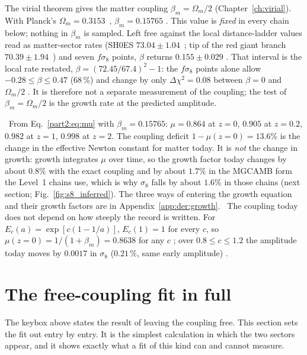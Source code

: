 \begin{keybox}[title={The coupling is predicted, not fitted}]
The virial theorem gives the matter coupling $\beta_m=\Omega_m/2$ (Chapter~\ref{ch:virial}). With Planck's $\Omega_m=0.3153$~\cite{Planck2018VI},
$\beta_m=0.15765$ \derived. This value is \emph{fixed} in every chain below; nothing in $\beta_m$ is sampled.
Left free against the local distance-ladder values read as matter-sector rates (SH0ES $73.04\pm1.04$~\cite{Riess2022}; tip of the red giant branch $70.39\pm1.94$~\cite{Freedman2025}) and seven $f\sigma_8$ points, $\beta$ returns $0.155\pm0.029$ \calc. That interval is the local rate restated, $\beta=(72.45/67.4)^2-1$: the $f\sigma_8$ points alone allow $-0.28\le\beta\le0.47$ (68\,\%) and change by only $\Delta\chi^2=0.08$ between $\beta=0$ and $\Omega_m/2$ \calc. It is therefore not a separate measurement of the coupling; the test of $\beta_m=\Omega_m/2$ is the growth rate at the predicted amplitude.
\end{keybox}

\begin{checkbox}
\calc\ From Eq.~\eqref{part2:eq:mu} with $\beta_m=0.15765$: $\mu=0.864$ at $z=0$, $0.905$ at $z=0.2$, $0.982$ at $z=1$, $0.998$ at $z=2$.
The coupling deficit $1-\mu(z{=}0)=13.6\%$ is the change in the effective Newton constant for matter today. It is \emph{not} the change in growth:
growth integrates $\mu$ over time, so the growth factor today changes by about $0.8\%$ with the exact coupling and by about $1.7\%$ in the MGCAMB form the
Level~1 chains use, which is why $\sigma_8$ falls by about $1.6\%$ in those chains (next section; Fig.~\ref{fig:s8_inferred}).
The three ways of entering the growth equation and their growth factors are in Appendix~\ref{app:der:growth}.
\calc\ The coupling today does not depend on how steeply the record is written. For $E_c(a)=\exp[c(1-1/a)]$, $E_c(1)=1$ for every $c$, so
$\mu(z{=}0)=1/(1+\beta_m)=0.8638$ for any $c$ \derived; over $0.8\le c\le1.2$ the amplitude today moves by $0.0017$ in $\sigma_8$
($0.21\,\%$, same early amplitude) \calc.
\end{checkbox}

\section{The free-coupling fit in full}\label{sec:dual_freecoupling}
The keybox above states the result of leaving the coupling free. This section sets the fit out entry by entry. It is the simplest
calculation in which the two sectors appear, and it shows exactly what a fit of this kind can and cannot measure.


